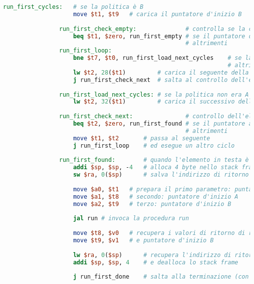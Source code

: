 \begin{center}
\begin{lstlisting}[language=mips, gobble=14, stepnumber=1]
                run_first_cycles:	# se la politica è B
                    move $t1, $t9	# carica il puntatore d'inizio B
                    
                run_first_check_empty:				# controlla se la coda è vuota
                    beq $t1, $zero, run_first_empty	# se il puntatore d'inizio è nullo, la coda è vuota
                									# altrimenti
                run_first_loop:
                    bne $t7, $t0, run_first_load_next_cycles	# se la politica non è A, carica il seguente della lista B
                												# altrimenti
                    lw $t2, 28($t1)			# carica il seguente della lista A
                    j run_first_check_next	# salta al controllo dell'elemento successivo
                    
                run_first_load_next_cycles:	# se la politica non era A
                    lw $t2, 32($t1)			# carica il successivo della lista B
                    
                run_first_check_next:				# controllo dell'elemento successivo
                    beq $t2, $zero, run_first_found	# se il puntatore all'elemento seguente è nullo, allora il task in testa è stato trovato
                									# altrimenti
                    move $t1, $t2		# passa al seguente
                    j run_first_loop	# ed esegue un altro ciclo
                
                run_first_found:		# quando l'elemento in testa è trovato
                    addi $sp, $sp, -4	# alloca 4 byte nello stack frame (1 word)
                    sw $ra, 0($sp)		# salva l'indirizzo di ritorno nello stack
                    
                    move $a0, $t1	# prepara il primo parametro: puntatore al task in testa alla coda
                    move $a1, $t8	# secondo: puntatore d'inizio A
                    move $a2, $t9	# terzo: puntatore d'inizio B
                    
                    jal run	# invoca la procedura run
                    
                    move $t8, $v0	# recupera i valori di ritorno di run: puntatore d'inizio A
                    move $t9, $v1	# e puntatore d'inizio B
                    
                    lw $ra, 0($sp)		# recupera l'indirizzo di ritorno al chiamante dallo stack
                    addi $sp, $sp, 4	# e dealloca lo stack frame
                
                    j run_first_done	# salta alla terminazione (con successo) della proocedura run_first
                        

\end{lstlisting}
\end{center}
